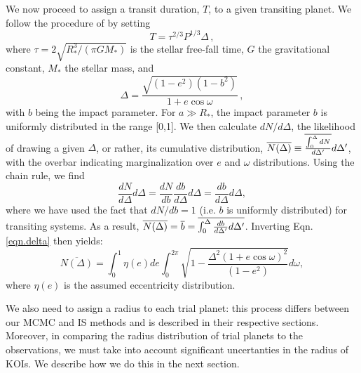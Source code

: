 We now proceed to assign a transit duration, $T$, to a given
transiting planet. We follow the procedure of \citet{Gaidos2013} 
by setting
\begin{equation}
\label{eq:T_IS}
T = \tau^{2/3}P^{1/3}\Delta\, ,
\end{equation}
where $\tau = 2\sqrt{R_*^3/(\pi G M_*)}$ is the stellar free-fall
time, $G$ the gravitational constant, $M_*$ the stellar mass, and
\begin{equation}
\label{eqn.delta}
\Delta = \frac{\sqrt{(1-e^2)(1-b^2)}}{1 + e \cos \omega}\, , 
\end{equation}
with $b$ being the impact parameter. For $a \gg R_*$, the impact
parameter $b$ is uniformly distributed in the range [0,1].
We then calculate $dN/d\Delta$, the likelihood of drawing a
given $\Delta$, or rather, its cumulative distribution,
$\overline{N(\Delta)} \equiv \overline{\int_0^\Delta
{dN}\over{d\Delta'}}d\Delta'$, with the overbar indicating 
marginalization over $e$ and $\omega$ distributions. 
Using the chain rule, we find
\begin{equation}
\label{eq:delta1}
{\frac{dN}{d\Delta}} d\Delta = 
{\frac{dN}{db}}
{\frac{db}{d\Delta}} d\Delta = 
{\frac{db}{d\Delta}} d\Delta,
\end{equation}
where we have used the fact that $dN/db = 1$ (i.e. $b$ is uniformly distributed) 
for transiting systems.
As a result, $\overline{N(\Delta)} = \overline{b} = \overline{\int_0^\Delta
  {{db}\over{d\Delta'}} d\Delta'}$.  Inverting
Eqn. \ref{eqn.delta} then yields:
\begin{equation}
\overline{N(\Delta)} = \int_0^1 \eta(e) de \int_0^{2\pi} \sqrt{1 -
  \frac{\Delta^2\left(1 + e \cos \omega\right)^2}{\left(1-e^2\right)}}d\omega, 
\end{equation}
where $\eta(e)$ is the assumed eccentricity distribution.  

We also need to assign a radius to each trial planet: this
process differs between our MCMC and IS methods and is described in
their respective sections. Moreover, in comparing the radius
distribution of trial planets to the observations, we must take into
account significant uncertanties in the radius of KOIs.
We describe how we do this in the next section.

